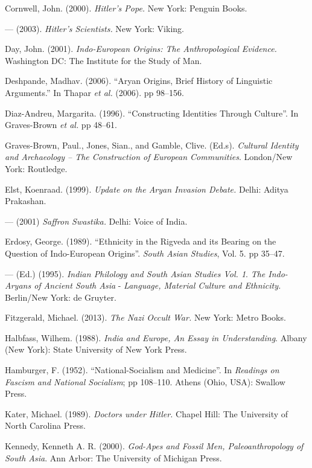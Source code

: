 \begin{thebibliography}{99}
  Cornwell, John. (2000). \textit{Hitler’s Pope. }New York: Penguin Books.

  — (2003). \textit{Hitler’s Scientists.} New York: Viking.

  Day, John. (2001). \textit{Indo-European Origins: The Anthropological Evidence.} Washington DC: The Institute for the Study of Man.

  Deshpande, Madhav. (2006). “Aryan Origins, Brief History of Linguistic Arguments.” In Thapar \textit{et al.} (2006). pp 98--156.

  Diaz-Andreu, Margarita. (1996). “Constructing Identities Through Culture”. In Graves-Brown \textit{et al.} pp 48--61.

  Graves-Brown, Paul., Jones, Sian., and Gamble, Clive. (Ed.s). \textit{Cultural Identity and Archaeology – The Construction of European Communities}. London/New York: Routledge.

  Elst, Koenraad. (1999). \textit{Update on the Aryan Invasion Debate. }Delhi: Aditya Prakashan.

  — (2001) \textit{Saffron Swastika. }Delhi: Voice of India.

  Erdosy, George. (1989). “Ethnicity in the Rigveda and its Bearing on the Question of Indo-European Origins”. \textit{South Asian Studies}, Vol. 5. pp 35--47.

  — (Ed.) (1995). \textit{Indian Philology and South Asian Studies Vol. 1}. \textit{The Indo-Aryans of Ancient South Asia} - \textit{Language, Material Culture and Ethnicity. } Berlin/New York: de Gruyter.

  Fitzgerald, Michael. (2013). \textit{The Nazi Occult War. }New York: Metro Books.

  Halbfass, Wilhem. (1988). \textit{India and Europe, An Essay in Understanding}. Albany (New York): State University of New York Press.

  Hamburger, F. (1952). “National-Socialism and Medicine”. In \textit{Readings on Fascism and National Socialism}; pp 108--110. Athens (Ohio, USA): Swallow Press.

  Kater, Michael. (1989). \textit{Doctors under Hitler.} Chapel Hill: The University of North Carolina Press.

  Kennedy, Kenneth A. R. (2000). \textit{God-Apes and Fossil Men, Paleoanthropology of South Asia}. Ann Arbor: The University of Michigan Press.


\end{thebibliography}
